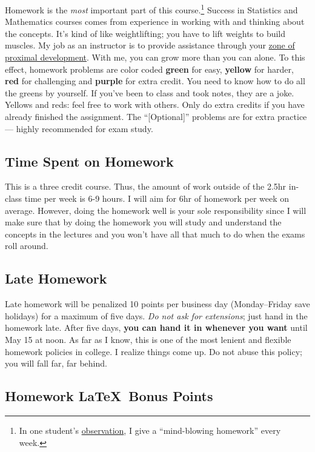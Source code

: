 \documentclass[12pt]{article}
\newcommand{\ingreen}[1]{\color{green}\textbf{#1} \color{black}}
\newcommand{\inyellow}[1]{\color{yellow}\textbf{#1} \color{black}}
\newcommand{\inred}[1]{\color{red}\textbf{#1} \color{black}}
\newcommand{\inpurple}[1]{\color{purple}\textbf{#1} \color{black}}
\newcommand{\qu}[1]{``#1''}
\begin{document}
Homework is the \textit{most} important part of this course.\footnote{In one student's \href{http://www.ratemyprofessors.com/ShowRatings.jsp?tid=1951051}{observation}, I give a \qu{mind-blowing homework} every week.} Success in Statistics and Mathematics courses comes from experience in working with and thinking about the concepts. It's kind of like weightlifting; you have to lift weights to build muscles. My job as an instructor is to provide assistance through your \href{http://en.wikipedia.org/wiki/Zone_of_proximal_development}{zone of proximal development}. With me, you can grow more than you can alone. To this effect, homework problems are color coded \ingreen{green} for easy, \inyellow{yellow} for harder, \inred{red} for challenging and \inpurple{purple} for extra credit. You need to know how to do all the greens by yourself. If you've been to class and took notes, they are a joke. Yellows and reds: feel free to work with others. Only do extra credits if you have already finished the assignment. The \qu{[Optional]} problems are for extra practice --- highly recommended for exam study.

\subsection*{Time Spent on Homework }

This is a three credit course. Thus, the amount of work outside of the 2.5hr in-class time per week is 6-9 hours. I will aim for 6hr of homework per week on average. However, doing the homework well is your sole responsibility since I will make sure that by doing the homework you will study and understand the concepts in the lectures and you won't have all that much to do when the exams roll around.

\subsection*{Late Homework}

Late homework will be penalized 10 points per business day (Monday--Friday save holidays) for a maximum of five days. \textit{Do not ask for extensions}; just hand in the homework late. After five days, \textbf{you can hand it in whenever you want} until May 15 at noon. As far as I know, this is one of the most lenient and flexible homework policies in college. I realize things come up. Do not abuse this policy; you will fall far, far behind.

\subsection*{Homework \LaTeX~Bonus Points}
\end{document}
